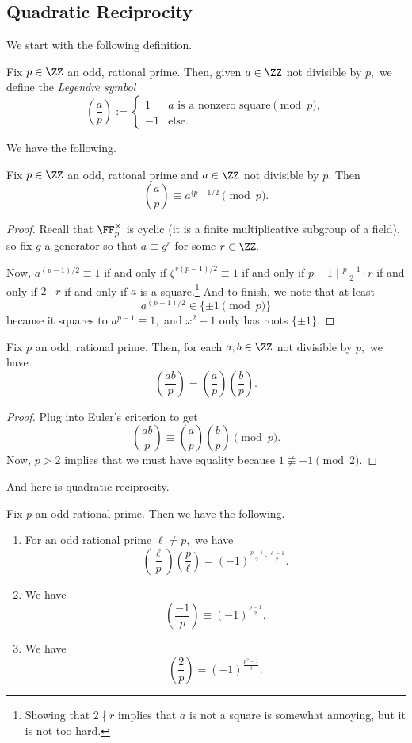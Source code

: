 \documentclass[../notes.tex]{subfiles}
\begin{document}
\subsection{Quadratic Reciprocity}
We start with the following definition.
\begin{defi}
	Fix $p\in\ZZ$ an odd, rational prime. Then, given $a\in\ZZ$ not divisible by $p,$ we define the \textit{Legendre symbol}
	\[\left(\frac ap\right):=\begin{cases}
		1 & a\text{ is a nonzero square}\pmod p, \\
		-1 & \text{else}.
	\end{cases}\]
\end{defi}
We have the following.
\begin{prop}
	Fix $p\in\ZZ$ an odd, rational prime and $a\in\ZZ$ not divisible by $p.$ Then
	\[\left(\frac ap\right)\equiv a^{(p-1/2}\pmod p.\]
\end{prop}
\begin{proof}
	Recall that $\FF_p^\times$ is cyclic (it is a finite multiplicative subgroup of a field), so fix $g$ a generator so that $a\equiv g^r$ for some $r\in\ZZ.$

	Now, $a^{(p-1)/2}\equiv1$ if and only if $\zeta^{r(p-1)/2}\equiv1$ if and only if $p-1\mid\frac{p-1}2\cdot r$ if and only if $2\mid r$ if and only if $a$ is a square.\footnote{Showing that $2\nmid r$ implies that $a$ is not a square is somewhat annoying, but it is not too hard.} And to finish, we note that at least
	\[a^{(p-1)/2}\in\{\pm1\pmod p\}\]
	because it squares to $a^{p-1}\equiv1,$ and $x^2-1$ only has roots $\{\pm1\}.$
\end{proof}
\begin{corollary}
	Fix $p$ an odd, rational prime. Then, for each $a,b\in\ZZ$ not divisible by $p,$ we have
	\[\left(\frac{ab}p\right)=\left(\frac ap\right)\left(\frac bp\right).\]
\end{corollary}
\begin{proof}
	Plug into Euler's criterion to get
	\[\left(\frac{ab}p\right)\equiv\left(\frac ap\right)\left(\frac bp\right)\pmod p.\]
	Now, $p>2$ implies that we must have equality because $1\not\equiv-1\pmod2.$
\end{proof}
And here is quadratic reciprocity.
\begin{theorem}
	Fix $p$ an odd rational prime. Then we have the following.
	\begin{enumerate}[label=(\alph*)]
		\item For an odd rational prime $\ell\ne p,$ we have
		\[\left(\frac\ell p\right)\left(\frac p\ell\right)=(-1)^{\frac{p-1}2\cdot\frac{\ell-1}2}.\]
		\item We have
		\[\left(\frac{-1}p\right)\equiv(-1)^{\frac{p-1}2}.\]
		\item We have
		\[\left(\frac 2p\right)=(-1)^{\frac{p^2-1}8}.\]
	\end{enumerate}
\end{theorem}
\end{document}
